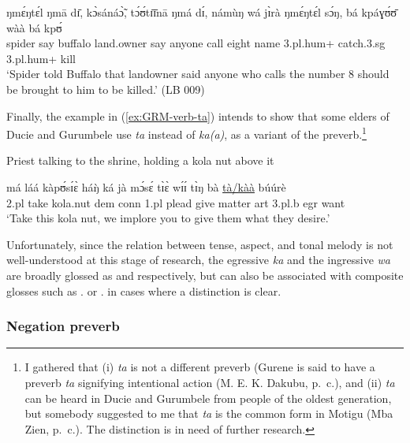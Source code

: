 \begin{exe}
\begin{exe}
\begin{exe}
{\begin{exe}
\begin{exe}
\begin{exe}
\begin{exe}
\begin{exe}
\begin{exe}
\begin{exe}
\begin{xlist}
\begin{exe}
\begin{exe}
\begin{exe}
\begin{exe}
\begin{exe}
\begin{exe}
\begin{exe}
\begin{exe}
\begin{exe}
\begin{exe}
\begin{exe}
\begin{exe}
\begin{exe}
\gll ŋmɛ́ŋtɛ́l   ŋmā    dɪ̄,    kɔ̀sánáɔ̃̀,   tɔ́ʊ́tɪ̄ɪ̄nā  ŋmá 
dɪ́,    námùŋ   wá    jɪ̀rà ŋmɛ́ŋtɛ́l sɔ́ŋ,    bá  kpáɣʊ́ʊ̄    wàà 
bá kpʊ́\\
spider     say   {\comp}   buffalo    land.owner say {\comp}  anyone   
{\ingr}   call eight     name {\sc 3.pl.hum+}    catch.{\sc 3.sg} {\foc}
 {\sc 3.pl.hum+}  kill\\
\glt `Spider told Buffalo that landowner said anyone who calls the number 8
should be brought to him to be killed.' (LB 009)
\z



Finally, the example in (\ref{ex:GRM-verb-ta})  intends to show that some
elders of Ducie and
Gurumbele use  {\it ta}  instead of {\it ka(a)},  as a variant of the
preverb.\footnote{I gathered that  (i)   {\it ta} is not a different
preverb (Gurene is said to have  a preverb {\it ta}  signifying intentional
action  (M. E. K. Dakubu, p.\ c.),  and  (ii)   {\it ta} can be heard in  Ducie 
and
Gurumbele from people of the oldest generation, but somebody suggested to me
that {\it ta} is the common form in Motigu (Mba Zien, p.\ c.).  The distinction
is  in need of further research. } 
 

\begin{exe}
   \ex\label{ex:GRM-verb-ta}{\rm Priest talking to the shrine, holding a kola
nut above it}

\gll  má láá kàpʊ́sɪ́ɛ̀ háŋ̀ ká jà mɔ́sɛ́ tɪ̀ɛ̀ wɪ́ɪ́ tɪ̀ŋ bà 
\underline{tà/kàà} búúrè\\
{\sc 2.pl} take kola.nut {\sc dem} {\sc conn} {\sc 1.pl} plead give matter {\sc
art} {\sc 3.pl.}b {\sc  egr} want\\
\glt   `Take this kola nut, we implore  you to give them what they desire.'

\z


Unfortunately, since the relation between tense, aspect, and tonal melody is not
well-understood at this stage of research, the  egressive {\it ka}   and the
ingressive  {\it wa} are  broadly glossed as {\egr} and {\ingr} respectively, 
but
can also be associated with composite glosses such as {\ipfv .\fut} or  {\ipfv
.\pres}  in cases where a distinction is clear.




\subsubsection{Negation preverb}
\label{sec:GRM-verb-neg}



\end{exe}
\end{exe}
\end{exe}
\end{exe}
\end{exe}
\end{exe}
\end{exe}
\end{exe}
\end{exe}
\end{exe}
\end{exe}
\end{exe}
\end{exe}
\end{exe}
\end{xlist}
\end{exe}
\end{exe}
\end{exe}
\end{exe}
\end{exe}
\end{exe}
\end{exe}}
\end{exe}
\end{exe}
\end{exe}
